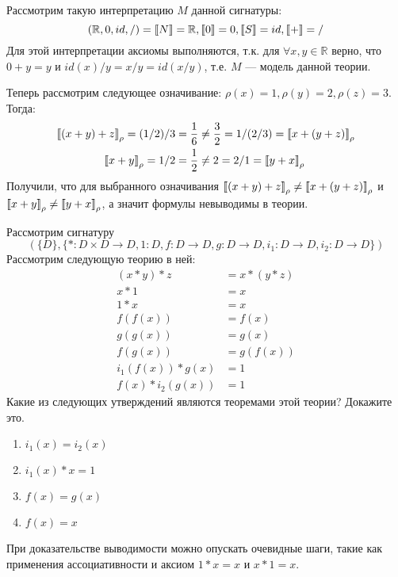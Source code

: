 \begin{solution}
Рассмотрим такую интерпретацию $M$ данной сигнатуры:
\[
	(\mathbb{R}, 0, id, /) = \left\llbracket N \right\rrbracket = \mathbb{R}, \left\llbracket 0 \right\rrbracket = 0, \left\llbracket S \right\rrbracket = id, \left\llbracket + \right\rrbracket = /
\]
Для этой интерпретации аксиомы выполняются, т.к. для $\forall x, y \in \mathbb{R}$ верно, что $0 + y = y$ и $id(x) / y = x / y = id(x / y)$, т.е. $M$ --- модель данной теории.

Теперь рассмотрим следующее означивание: $\rho(x) = 1, \rho(y) = 2, \rho(z) = 3$. Тогда:
\begin{align*}
	\left\llbracket (x + y) + z \right\rrbracket_{\rho} = (1 / 2) / 3 = \frac{1}{6} &\neq \frac{3}{2} = 1 / (2 / 3) = \left\llbracket x + (y + z) \right\rrbracket_{\rho}  \\
	\left\llbracket x+y \right\rrbracket_{\rho} = 1 / 2 = \frac{1}{2} &\neq 2 = 2 / 1 = \left\llbracket y+x \right\rrbracket_{\rho}
\end{align*}
Получили, что для выбранного означивания $\left\llbracket (x + y) + z \right\rrbracket_{\rho} \neq \left\llbracket x + (y + z) \right\rrbracket_{\rho}$ и $\left\llbracket x+y \right\rrbracket_{\rho} \neq \left\llbracket y+x \right\rrbracket_{\rho}$, а значит формулы невыводимы в теории. \xqed
\end{solution}
\newpage
\begin{task}[3]
Рассмотрим сигнатуру
\[ (\{D\}, \{ * : D \times D \to D, 1 : D, f : D \to D, g : D \to D, i_1 : D \to D, i_2 : D \to D \}) \]
Рассмотрим следующую теорию в ней:
\begin{align*}
(x * y) * z & = x * (y * z) \\
x * 1 & = x \\
1 * x & = x \\
f(f(x)) & = f(x) \\
g(g(x)) & = g(x) \\
f(g(x)) & = g(f(x)) \\
i_1(f(x)) * g(x) & = 1 \\
f(x) * i_2(g(x)) & = 1
\end{align*}
Какие из следующих утверждений являются теоремами этой теории? Докажите это.
\begin{enumerate}
\item $i_1(x) = i_2(x)$ \label{task3:t1}
\item $i_1(x) * x = 1$  \label{task3:t2}
\item $f(x) = g(x)$     \label{task3:t3}
\item $f(x) = x$        \label{task3:t4}
\end{enumerate}
При доказательстве выводимости можно опускать очевидные шаги, такие как применения ассоциативности и аксиом $1 * x = x$ и $x * 1 = x$.
\end{task}
